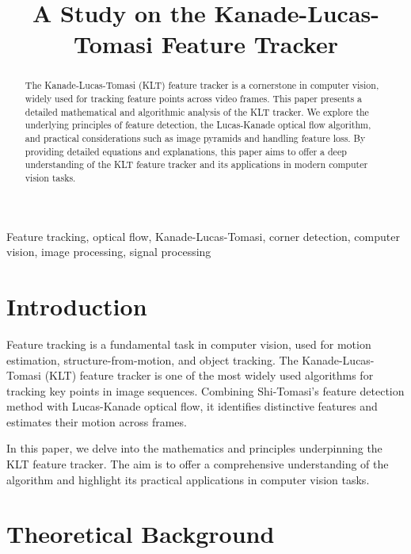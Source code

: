 \documentclass[10pt, conference, letterpaper]{IEEEtran}
\begin{document}
\title{A Study on the Kanade-Lucas-Tomasi Feature Tracker}

\author{
}

\maketitle

\begin{abstract}
The Kanade-Lucas-Tomasi (KLT) feature tracker is a cornerstone in computer vision, widely used for tracking feature points across video frames. This paper presents a detailed mathematical and algorithmic analysis of the KLT tracker. We explore the underlying principles of feature detection, the Lucas-Kanade optical flow algorithm, and practical considerations such as image pyramids and handling feature loss. By providing detailed equations and explanations, this paper aims to offer a deep understanding of the KLT feature tracker and its applications in modern computer vision tasks.
\end{abstract}

\begin{IEEEkeywords}
Feature tracking, optical flow, Kanade-Lucas-Tomasi, corner detection, computer vision, image processing, signal processing
\end{IEEEkeywords}

\section{Introduction}
Feature tracking is a fundamental task in computer vision, used for motion estimation, structure-from-motion, and object tracking. The Kanade-Lucas-Tomasi (KLT) feature tracker is one of the most widely used algorithms for tracking key points in image sequences. Combining Shi-Tomasi's feature detection method with Lucas-Kanade optical flow, it identifies distinctive features and estimates their motion across frames.

In this paper, we delve into the mathematics and principles underpinning the KLT feature tracker. The aim is to offer a comprehensive understanding of the algorithm and highlight its practical applications in computer vision tasks.

\section{Theoretical Background}
\end{document}
